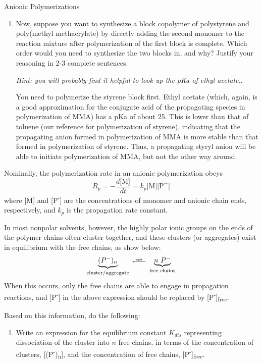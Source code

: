 \begin{activity}{Anionic Polymerizations}
\begin{exercises}
\begin{enumerate}
			
			\item Now, suppose you want to synthesize a block copolymer of polystyrene and poly(methyl methacrylate) by directly adding the second monomer to the reaction mixture after polymerization of the first block is complete.  Which order would you need to synthesize the two blocks in, and why?  Justify your reasoning in 2-3 complete sentences.
			
				\emph{Hint: you will probably find it helpful to look up the pKa of ethyl acetate.}.
			
				\begin{solution}{}
					You need to polymerize the styrene block first.  Ethyl acetate (which, again, is a good approximation for the conjugate acid of the propagating species in polymerization of MMA) has a pKa of about 25.  This is lower than that  of toluene (our reference for polymerization of styrene), indicating that the propagating anion formed in polymerization of MMA is more stable than that formed in polymerization of styrene.  Thus, a propagating styryl anion will be able to initiate polymerization of MMA, but not the other way around.
				\end{solution}
				
		\end{enumerate}

	\exercise Nominally, the polymerization rate in an anionic polymerization obeys
		\begin{equation*}
			R_p = -\frac{d\text{[M]}}{dt} = k_p\text{[M][P}^-\text{]}
		\end{equation*}
		where [M] and [P\textsuperscript{-}] are the concentrations of monomer and anionic chain ends, respectively, and $k_p$ is the propagation rate constant.
		
		In most nonpolar solvents, however, the highly polar ionic groups on the ends of the polymer chains often cluster together, and these clusters (or aggregates) exist in equilibrium with the free chains, as show below:
			\begin{equation*}
				\underbrace{(P^-)_n}_{\text{cluster/aggregate}} \ce{<<=>} \underbrace{n\,\,P^-}_{\text{free chains}}
			\end{equation*}
		When this occurs, only the free chains are able to engage in propagation reactions, and [P\textsuperscript{-}] in the above expression should be replaced by [P\textsuperscript{-}]\textsubscript{free}.
		
		Based on this information, do the following:
		\begin{enumerate}
			\item Write an expression for the equilibrium constant $K_{dis}$ representing dissociation of the cluster into $n$ free chains, in terms of the concentration of clusters, [(P\textsuperscript{-})\textsubscript{n}], and the concentration of free chains, [P\textsuperscript{-}]\textsubscript{free}.
				

\end{enumerate}
\end{exercises}
\end{activity}
